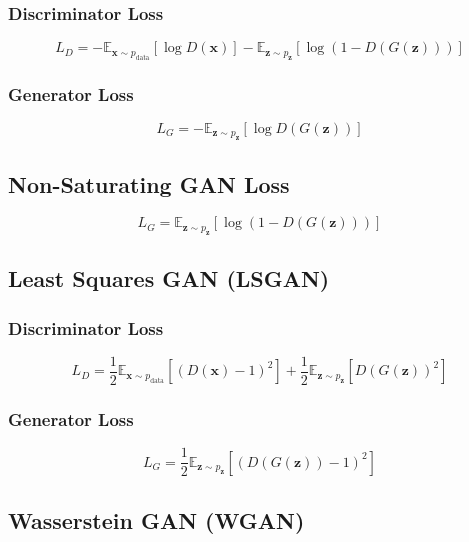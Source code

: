 \documentclass{article}
\begin{document}
\subsubsection{Discriminator Loss}
\begin{equation}
L_D = - \mathbb{E}_{\mathbf{x} \sim p_{\text{data}}} [\log D(\mathbf{x})] - \mathbb{E}_{\mathbf{z} \sim p_{\mathbf{z}}} [\log (1 - D(G(\mathbf{z})))]
\end{equation}

\subsubsection{Generator Loss}
\begin{equation}
L_G = - \mathbb{E}_{\mathbf{z} \sim p_{\mathbf{z}}} [\log D(G(\mathbf{z}))]
\end{equation}

\subsection{Non-Saturating GAN Loss}
\begin{equation}
L_G = \mathbb{E}_{\mathbf{z} \sim p_{\mathbf{z}}} [\log (1 - D(G(\mathbf{z})))]
\end{equation}

\subsection{Least Squares GAN (LSGAN)}

\subsubsection{Discriminator Loss}
\begin{equation}
L_D = \frac{1}{2} \mathbb{E}_{\mathbf{x} \sim p_{\text{data}}} [(D(\mathbf{x}) - 1)^2] + \frac{1}{2} \mathbb{E}_{\mathbf{z} \sim p_{\mathbf{z}}} [D(G(\mathbf{z}))^2]
\end{equation}

\subsubsection{Generator Loss}
\begin{equation}
L_G = \frac{1}{2} \mathbb{E}_{\mathbf{z} \sim p_{\mathbf{z}}} [(D(G(\mathbf{z})) - 1)^2]
\end{equation}

\subsection{Wasserstein GAN (WGAN)}
\end{document}
